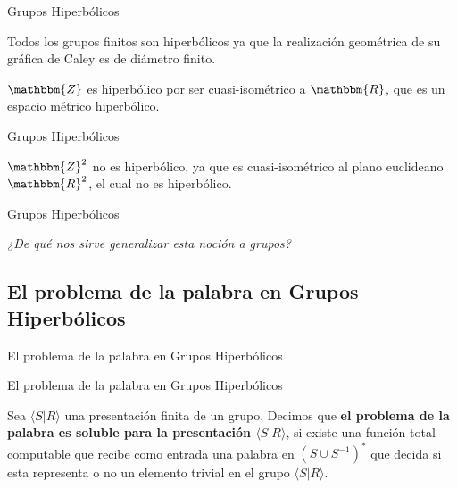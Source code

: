 \documentclass[xcolor=dvipsnames]{beamer}
\theoremstyle{largebreak}
\newcommand{\bbm}[1]{\ensuremath{\mathbbm{#1}}}
\newcommand{\gen}[1]{\ensuremath{\langle#1\rangle}}
\begin{document}
\begin{frame}{Grupos Hiperbólicos}
    \begin{exa}
        Todos los grupos finitos son hiperbólicos ya que la realización geométrica de su gráfica de Caley es de diámetro finito.
    \end{exa}

    \begin{exa}
        $\bbm{Z}$ es hiperbólico por ser cuasi-isométrico a $\bbm{R}$, que es un espacio métrico hiperbólico.
    \end{exa}
\end{frame}

\begin{frame}{Grupos Hiperbólicos}
    \begin{exa}
        $\bbm{Z}^2$ no es hiperbólico, ya que es cuasi-isométrico al plano euclideano $\bbm{R}^2$, el cual no es hiperbólico.
    \end{exa}
\end{frame}

\begin{frame}{Grupos Hiperbólicos}
    \begin{center}
        \Large \textit{¿De qué nos sirve generalizar esta noción a grupos?}
    \end{center}
\end{frame}

\subsection{El problema de la palabra en Grupos Hiperbólicos}

\begin{frame}
    \begin{center}
        \Large El problema de la palabra en Grupos Hiperbólicos
    \end{center}

\end{frame}

\begin{frame}{El problema de la palabra en Grupos Hiperbólicos}
    \begin{mydef}
        Sea $\gen{S|R}$ una presentación finita de un grupo. Decimos que \textbf{el problema de la palabra es soluble para la presentación $\gen{S|R}$}, si existe una función total computable que recibe como entrada una palabra en $(S\cup S^{-1})^{*}$ que decida si esta representa o no un elemento trivial en el grupo $\gen{S|R}$.
    \end{mydef}
\end{frame}
\end{document}

